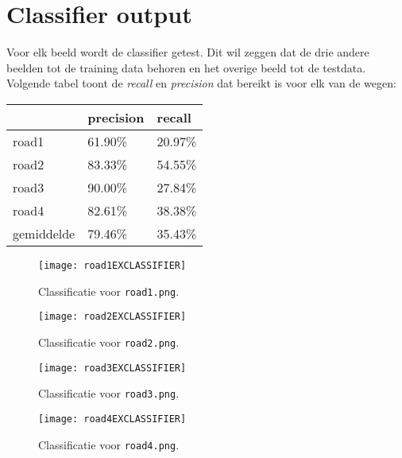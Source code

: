 \documentclass{article}
\begin{document}
\section{Classifier output}
Voor elk beeld wordt de classifier getest. Dit wil zeggen dat de drie andere beelden tot de training data behoren en het overige beeld tot de testdata. Volgende tabel toont de \textit{recall} en \textit{precision} dat bereikt is voor elk van de wegen:
\begin{table}[ht]
	\centering
	\begin{tabular}{l | l | l}
		& precision & recall \\
		\hline
		road1 & 61.90\% & 20.97\% \\
		road2 & 83.33\% & 54.55\% \\
		road3 & 90.00\% & 27.84\% \\
		road4 & 82.61\% & 38.38\% \\
		\hline
		gemiddelde & 79.46\% & 35.43\%
	\end{tabular}
\end{table}
\begin{figure}
	\texttt{[image: road1EXCLASSIFIER]}
	\caption{Classificatie voor \texttt{road1.png}.}
\end{figure}
\begin{figure}
	\texttt{[image: road2EXCLASSIFIER]}
	\caption{Classificatie voor \texttt{road2.png}.}
\end{figure}
\begin{figure}
	\texttt{[image: road3EXCLASSIFIER]}
	\caption{Classificatie voor \texttt{road3.png}.}
\end{figure}
\begin{figure}
	\texttt{[image: road4EXCLASSIFIER]}
	\caption{Classificatie voor \texttt{road4.png}.}
\end{figure}


	
\end{document}
